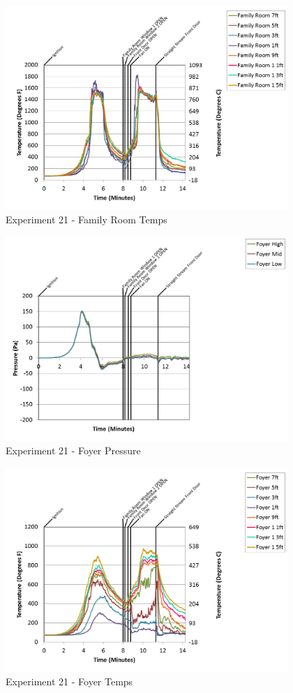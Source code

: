 \documentclass{article}
\begin{document}
\begin{appendices}
\begin{figure}[h!]
	\centering
	\includegraphics[height=3.05in]{0_Images/Results_Charts/Exp_21_Charts/FamilyRoomTemps.png}
	\caption{Experiment 21 - Family Room Temps}
\end{figure}

\clearpage

\begin{figure}[h!]
	\centering
	\includegraphics[height=3.05in]{0_Images/Results_Charts/Exp_21_Charts/FoyerPressure.png}
	\caption{Experiment 21 - Foyer Pressure}
\end{figure}


\begin{figure}[h!]
	\centering
	\includegraphics[height=3.05in]{0_Images/Results_Charts/Exp_21_Charts/FoyerTemps.png}
	\caption{Experiment 21 - Foyer Temps}
\end{figure}


\end{appendices}
\end{document}
